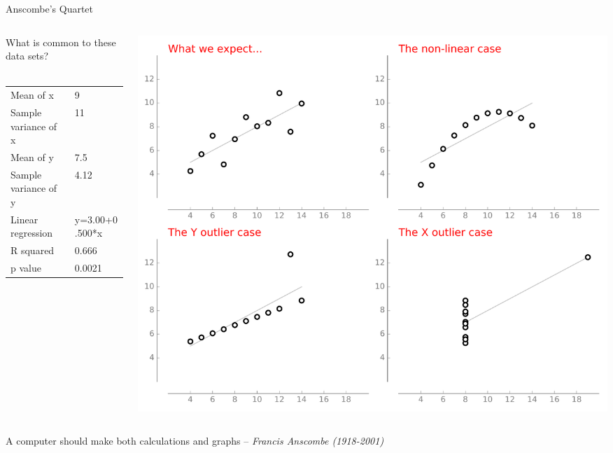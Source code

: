 \documentclass[10pt,aspectratio=169]{beamer}
\begin{document}
\begin{frame}{Anscombe's Quartet}
  \begin{columns}
    \begin{column}{.5\textwidth}    
      What is common to these data sets?\\
      ~\\
      \begin{tabular}{ll}
        Mean of x            & 9\\
        Sample variance of x & 11\\
        Mean of y            & 7.5\\
        Sample variance of y & 4.12\\
        Linear regression    & y=3.00+0.500*x\\
        R squared            & 0.666\\
        p value              & 0.0021\\
      \end{tabular}

    \end{column}
    \begin{column}{.5\textwidth}
      \includegraphics[width=\textwidth]{Anscombe-plots.pdf}
    \end{column}
  \end{columns}

\vfill
\noindent A computer should make both calculations and graphs -- {\em Francis Anscombe (1918-2001)}
  
\end{frame}
\end{document}
